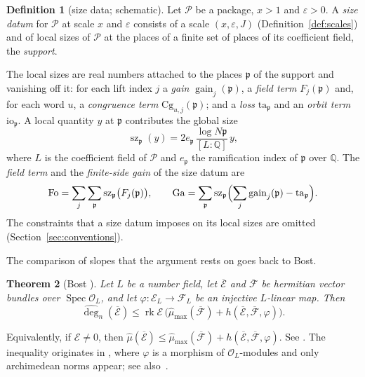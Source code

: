 \documentclass[11pt]{amsbook}
\theoremstyle{plain}
\newtheorem{theorem}{Theorem}[section]
\theoremstyle{definition}
\newtheorem{definition}[theorem]{Definition}
\theoremstyle{remark}
\numberwithin{equation}{section}
\numberwithin{figure}{chapter}
\numberwithin{table}{chapter}
\newcommand{\Q}{\mathbb{Q}}
\newcommand{\eps}{\varepsilon}
\newcommand{\rk}{\operatorname{rk}}
\newcommand{\Cg}{\mathrm{Cg}}
\newcommand{\Fo}{\mathrm{Fo}}
\newcommand{\Ga}{\mathrm{Ga}}
\begin{document}
\begin{definition}[size data; schematic]\label{def:size-datum}
Let $\mathcal P$ be a package, $x>1$ and $\eps>0$. A \emph{size datum}
for $\mathcal P$ at scale $x$ and $\eps$ consists of a scale
$(x,\eps,J)$ (Definition~\ref{def:scales}) and of local sizes of
$\mathcal P$ at the places of a finite set of places of its
coefficient field, the \emph{support}.
\end{definition}

\noindent The local sizes are real numbers attached to the places
$\mathfrak p$ of the support and vanishing off it: for each lift index
$j$ a \emph{gain} $\operatorname{gain}_j(\mathfrak p)$, a \emph{field
term} $F_j(\mathfrak p)$ and, for each word $u$, a \emph{congruence
term} $\Cg_{u,j}(\mathfrak p)$; and a \emph{loss}
$\mathrm{ta}_{\mathfrak p}$ and an \emph{orbit term}
$\mathrm{io}_{\mathfrak p}$. A local quantity $y$ at $\mathfrak p$
contributes the global size
\[
\operatorname{sz}_{\mathfrak p}(y)=2e_{\mathfrak p}\,
\frac{\log N\mathfrak p}{[L:\Q]}\,y,
\]
where $L$ is the coefficient field of $\mathcal P$ and $e_{\mathfrak
p}$ the ramification index of $\mathfrak p$ over $\Q$. The
\emph{field term} and the \emph{finite-side gain} of the size datum are
\[
\Fo=\sum_j\sum_{\mathfrak p}\operatorname{sz}_{\mathfrak p}
\bigl(F_j(\mathfrak p)\bigr),\qquad
\Ga=\sum_{\mathfrak p}\operatorname{sz}_{\mathfrak p}\Bigl(
\sum_j\operatorname{gain}_j(\mathfrak p)-\mathrm{ta}_{\mathfrak p}
\Bigr).
\]
The constraints that a size datum imposes on its local sizes are
omitted (Section~\ref{sec:conventions}).

The comparison of slopes that the argument rests on goes back to Bost.

\begin{theorem}[Bost \cite{Bost2001}]\label{thm:bost}
Let $L$ be a number field, let $\overline{\mathcal E}$ and
$\overline{\mathcal F}$ be hermitian vector bundles over
$\operatorname{Spec}\mathcal O_L$, and let $\varphi\colon\mathcal
E_L\to\mathcal F_L$ be an injective $L$-linear map. Then
\[
\widehat{\deg}_n(\overline{\mathcal E})\le\rk\mathcal E\,
\bigl(\hat\mu_{\max}(\overline{\mathcal F})+h(\overline{\mathcal E},
\overline{\mathcal F},\varphi)\bigr).
\]
\end{theorem}

\noindent Equivalently, if $\mathcal E\ne0$, then
$\hat\mu(\overline{\mathcal E})\le\hat\mu_{\max}(\overline{\mathcal
F})+h(\overline{\mathcal E},\overline{\mathcal F},\varphi)$. See
\cite[\S4.1.4, Prop.~4.5, (4.10)--(4.11)]{Bost2001}. The
inequality originates in \cite[\S4.3.1, Prop.~4.3(1)]{Bost1996}, where
$\varphi$ is a morphism of $\mathcal O_L$-modules and only archimedean
norms appear; see also~\cite{Chen2010}.
\end{document}
